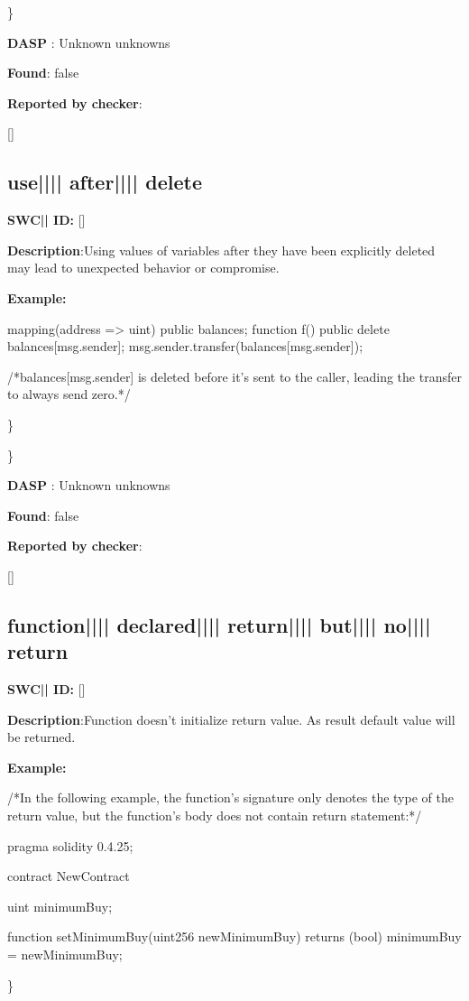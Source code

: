 \documentclass{article}
\begin{document}
\} 

\textbf{DASP} : Unknown unknowns

\textbf{Found}: false

\textbf{Reported by checker}: 
\begin{ffcode} 

[]
\end{ffcode} 
\subsection{use{||\textunderscore|| }after{||\textunderscore|| }delete} 
\textbf{SWC{|\textunderscore| }ID:} []

\textbf{Description}:Using values of variables after they have been explicitly deleted may lead to unexpected behavior or compromise.


\textbf{Example:} 
\begin{ffcode} 

mapping(address => uint) public balances;
function f() public {
    delete balances[msg.sender];
    msg.sender.transfer(balances[msg.sender]);
}

 /*balances[msg.sender] is deleted before it's sent to the caller, leading the transfer to always send zero.*/ 

\end{ffcode} 
\} 

\} 

\textbf{DASP} : Unknown unknowns

\textbf{Found}: false

\textbf{Reported by checker}: 
\begin{ffcode} 

[]
\end{ffcode} 
\subsection{function{||\textunderscore|| }declared{||\textunderscore|| }return{||\textunderscore|| }but{||\textunderscore|| }no{||\textunderscore|| }return} 
\textbf{SWC{|\textunderscore| }ID:} []

\textbf{Description}:Function doesn't initialize return value. As result default value will be returned.


\textbf{Example:} 
\begin{ffcode} 

/*In the following example, the function's signature only denotes the type of the return value, but the function's body does not contain return statement:*/ 

pragma solidity 0.4.25;

contract NewContract {
    uint minimumBuy;

    function setMinimumBuy(uint256 newMinimumBuy) returns (bool){
        minimumBuy = newMinimumBuy;
    }
}

\end{ffcode} 
\} 
\end{document}
